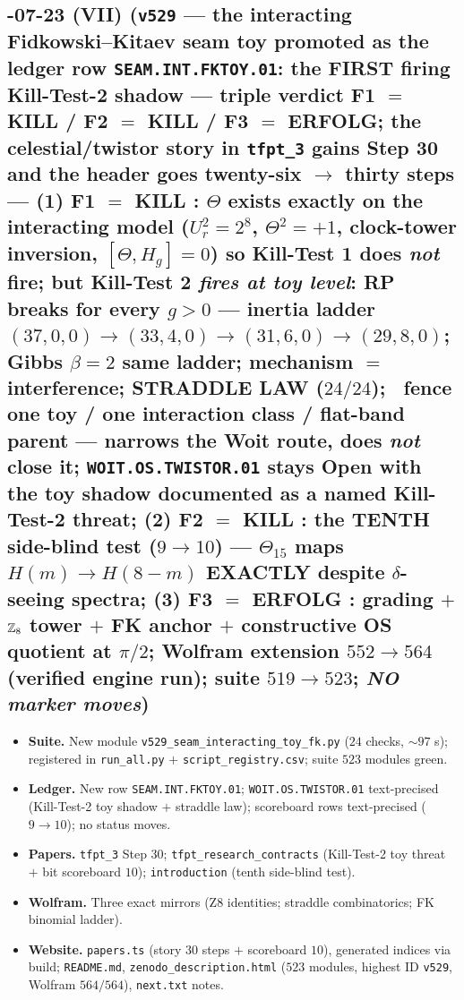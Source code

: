 \subsection*{-07-23 (VII) (\texttt{v529} --- the interacting Fidkowski--Kitaev seam toy promoted as the ledger row \texttt{SEAM.INT.FKTOY.01}: the FIRST firing Kill-Test-2 shadow --- triple verdict F1 $=$ KILL / F2 $=$ KILL / F3 $=$ ERFOLG; the celestial/twistor story in \texttt{tfpt\_3} gains Step 30 and the header goes twenty-six $\to$ thirty steps --- (1) F1 $=$ KILL \mE: $\Theta$ exists exactly on the interacting model ($U_r^2=2^8$, $\Theta^2=+1$, clock-tower inversion, $[\Theta,H_g]=0$) so Kill-Test 1 does \emph{not} fire; but Kill-Test 2 \emph{fires at toy level}: RP breaks for every $g>0$ --- inertia ladder $(37,0,0)\to(33,4,0)\to(31,6,0)\to(29,8,0)$; Gibbs $\beta=2$ same ladder; mechanism $=$ interference; STRADDLE LAW ($24/24$); \mC\ fence one toy / one interaction class / flat-band parent --- narrows the Woit route, does \emph{not} close it; \texttt{WOIT.OS.TWISTOR.01} stays Open with the toy shadow documented as a named Kill-Test-2 threat; (2) F2 $=$ KILL \mE: the TENTH side-blind test ($9\to10$) --- $\Theta_{15}$ maps $H(m)\to H(8-m)$ EXACTLY despite $\delta$-seeing spectra; (3) F3 $=$ ERFOLG \mE: grading $+$ $\mathbb{Z}_8$ tower $+$ FK anchor $+$ constructive OS quotient at $\pi/2$; Wolfram extension $552\to564$ (verified engine run); suite $519\to523$; \emph{NO marker moves})}
\begin{itemize}[leftmargin=1.5em]
\item \textbf{Suite.} New module \texttt{v529\_seam\_interacting\_toy\_fk.py} ($24$ checks, $\sim97$ s);
registered in \texttt{run\_all.py} $+$ \texttt{script\_registry.csv}; suite $523$ modules green.
\item \textbf{Ledger.} New row \texttt{SEAM.INT.FKTOY.01}; \texttt{WOIT.OS.TWISTOR.01} text-precised
(Kill-Test-2 toy shadow $+$ straddle law); scoreboard rows text-precised ($9\to10$); no status moves.
\item \textbf{Papers.} \texttt{tfpt\_3} Step 30; \texttt{tfpt\_research\_contracts} (Kill-Test-2 toy
threat $+$ bit scoreboard $10$); \texttt{introduction} (tenth side-blind test).
\item \textbf{Wolfram.} Three exact mirrors (Z8 identities; straddle combinatorics; FK binomial ladder).
\item \textbf{Website.} \texttt{papers.ts} (story $30$ steps $+$ scoreboard $10$), generated indices via build;
\texttt{README.md}, \texttt{zenodo\_description.html} ($523$ modules, highest ID \texttt{v529}, Wolfram $564/564$),
\texttt{next.txt} notes.
\end{itemize}

